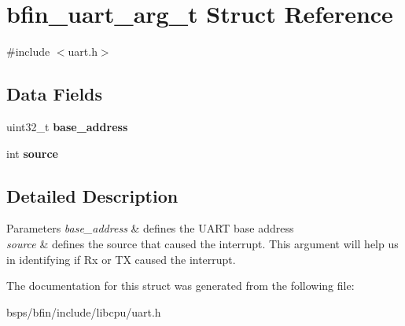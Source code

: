 \hypertarget{structbfin__uart__arg__t}{}\section{bfin\+\_\+uart\+\_\+arg\+\_\+t Struct Reference}
\label{structbfin__uart__arg__t}


{\ttfamily \#include $<$uart.\+h$>$}

\subsection*{Data Fields}
\begin{DoxyCompactItemize}
\item 
\mbox{\label{structbfin__uart__arg__t_a4f7ccce55fc8158919fa4229e5193e59}} 
uint32\+\_\+t {\bfseries base\+\_\+address}
\item 
\mbox{\label{structbfin__uart__arg__t_ae78a0bc71485ef232610b2f2843d0cc3}} 
int {\bfseries source}
\end{DoxyCompactItemize}


\subsection{Detailed Description}

\begin{DoxyParams}{Parameters}
{\em base\+\_\+address} & defines the U\+A\+RT base address \\
\hline
{\em source} & defines the source that caused the interrupt. This argument will help us in identifying if Rx or TX caused the interrupt. \\
\hline
\end{DoxyParams}


The documentation for this struct was generated from the following file\+:\begin{DoxyCompactItemize}
\item 
bsps/bfin/include/libcpu/uart.\+h\end{DoxyCompactItemize}
